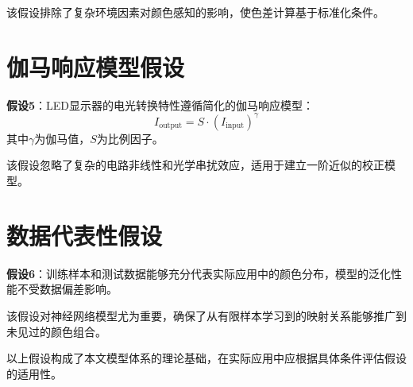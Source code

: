 该假设排除了复杂环境因素对颜色感知的影响，使色差计算基于标准化条件。

\section[\hspace{-2pt}伽马响应模型假设]{{\heiti{} \hspace{-8pt}伽马响应模型假设}}\label{section2: 伽马响应模型假设}

\textbf{假设5}：LED显示器的电光转换特性遵循简化的伽马响应模型：
$$I_{\text{output}} = S \cdot (I_{\text{input}})^{\gamma}$$
其中$\gamma$为伽马值，$S$为比例因子。

该假设忽略了复杂的电路非线性和光学串扰效应，适用于建立一阶近似的校正模型。

\section[\hspace{-2pt}数据代表性假设]{{\heiti{} \hspace{-8pt}数据代表性假设}}\label{section2: 数据代表性假设}

\textbf{假设6}：训练样本和测试数据能够充分代表实际应用中的颜色分布，模型的泛化性能不受数据偏差影响。

该假设对神经网络模型尤为重要，确保了从有限样本学习到的映射关系能够推广到未见过的颜色组合。

以上假设构成了本文模型体系的理论基础，在实际应用中应根据具体条件评估假设的适用性。

